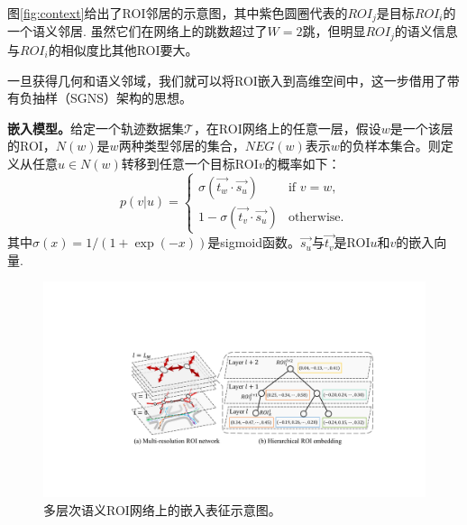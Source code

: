 图\ref{fig:context}给出了ROI邻居的示意图，其中紫色圆圈代表的${ROI}_j$是目标${ROI}_i$的一个语义邻居. 虽然它们在网络上的跳数超过了$W=2$跳，但明显${ROI}_j$的语义信息与${ROI}_i$的相似度比其他ROI要大。

一旦获得几何和语义邻域，我们就可以将ROI嵌入到高维空间中，这一步借用了带有负抽样（SGNS）架构的思想\cite{mikolov2013distributed}。

\vspace{3mm}
\textbf{嵌入模型。}给定一个轨迹数据集$\mathcal{T}$，在ROI网络上的任意一层，假设$w$是一个该层的ROI，$N(w)$是$w$两种类型邻居的集合，$NEG(w)$表示$w$的负样本集合。则定义从任意$u\in{N(w)}$转移到任意一个目标ROI$v$的概率如下：
\begin{equation}
\label{eq:transP}
p(v|u) =
\begin{cases}
\sigma(\vec{t_w}\cdot{}\vec{s_u}) & \text{if } v = w,\\
1- \sigma(\vec{t_v}\cdot{}\vec{s_u}) & \text{otherwise}.
\end{cases}
\end{equation}
其中$\sigma(x)=1/(1+\exp{(-x)})$是sigmoid函数。$\vec{s_u}$与$\vec{t_v}$是ROI$u$和$v$的嵌入向量.


\begin{figure}[!t]
\centering
\includegraphics[width=130mm]{pics/Hembedding.pdf}
\caption {多层次语义ROI网络上的嵌入表征示意图。}
\label{fig:Hembedding}
\end{figure}

